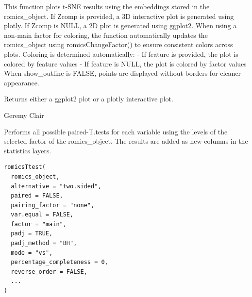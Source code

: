 \documentclass[a4paper]{book}
\begin{document}
%
\begin{Details}
This function plots t-SNE results using the embeddings stored in the romics\_object.
If Zcomp is provided, a 3D interactive plot is generated using plotly.
If Zcomp is NULL, a 2D plot is generated using ggplot2.
When using a non-main factor for coloring, the function automatically updates the romics\_object
using romicsChangeFactor() to ensure consistent colors across plots.
Coloring is determined automatically:
- If feature is provided, the plot is colored by feature values
- If feature is NULL, the plot is colored by factor values
When show\_outline is FALSE, points are displayed without borders for cleaner appearance.
\end{Details}
%
\begin{Value}
Returns either a ggplot2 plot or a plotly interactive plot.
\end{Value}
%
\begin{Author}
Geremy Clair
\end{Author}
%
\begin{Description}
Performs all possible paired-T.tests for each variable using the levels of the selected factor of the romics\_object. The results are added as new columns in the statistics layers.
\end{Description}
%
\begin{Usage}
\begin{verbatim}
romicsTtest(
  romics_object,
  alternative = "two.sided",
  paired = FALSE,
  pairing_factor = "none",
  var.equal = FALSE,
  factor = "main",
  padj = TRUE,
  padj_method = "BH",
  mode = "vs",
  percentage_completeness = 0,
  reverse_order = FALSE,
  ...
)
\end{verbatim}
\end{Usage}
%
\end{document}
